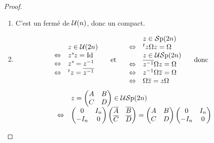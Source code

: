 \begin{proof}\ 

\begin{enumerate}
 \item C'est un fermé de $\mathcal{U}(n)$, donc un compact.
 \item
\begin{displaymath}\begin{array}{ccccc} \begin{array}{rl}
                    & z\in \mathcal{U}(2n) \\
\Leftrightarrow & z^{*}\hspace{-0.1em}z = \operatorname{Id} \\
\Leftrightarrow & z^{*}\hspace{-0.1em} = z^{-1} \\
\Leftrightarrow & ^tz = \overline{z^{-1}}
   \end{array} &  \text{ et }  & 
\begin{array}{rl}
                    & z \in \mathcal{S}\textnormal{p}(2n) \\
\Leftrightarrow & ^tz\Omega z = \Omega \\
                    & z \in \mathcal{US}\textnormal{p}(2n) \\
\Leftrightarrow & \overline{z^{-1}}\Omega z = \Omega \\
\Leftrightarrow & z^{-1}\Omega \overline{z} = \Omega \\
\Leftrightarrow & \Omega \overline{z} = z \Omega \\
\end{array}&  \text{ donc }  & 
\end{array} \end{displaymath}
\begin{displaymath}
\begin{array}{rl}
                    & z=\begin{pmatrix}   A&B\\
C&D\end{pmatrix}\in \mathcal{US}\textnormal{p}(2n) \\
\Leftrightarrow & \begin{pmatrix}0&I_n\\-I_n&0 \end{pmatrix}
\begin{pmatrix}\overline{A}&\overline{B}\\ \overline{C}&\overline{D}
\end{pmatrix} = \begin{pmatrix}A&B\\C&D \end{pmatrix}
\begin{pmatrix}0&I_n\\-I_n&0 \end{pmatrix}  \\

\end{array}
\end{displaymath}
\end{enumerate}
\end{proof}
